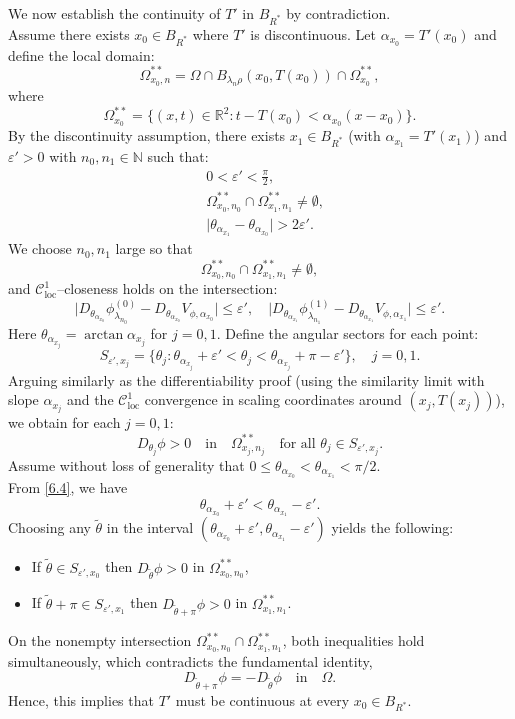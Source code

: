\documentclass[
  sn-mathphys-num,
  colorlinks,
  linkcolor=darkmagenta,
  citecolor=rufous,
  urlcolor=zaffre,
  hypertexnames=false
]{sn-jnl}
\numberwithin{equation}{section}
\begin{document}
We now establish the continuity of $T'$ in $B_{R^*}$ by contradiction.\\ Assume there exists $x_0 \in B_{R^*}$ where $T'$ is discontinuous. Let $\alpha_{x_0} = T'(x_0)$ and define the local domain:
$$
\Omega_{x_0,n}^{**} = \Omega \cap B_{\lambda_n\rho}(x_0,T(x_0)) \cap \Omega_{x_0}^{**},
$$
where 
$$
\Omega_{x_0}^{**} = \{(x,t) \in \mathbb{R}^2 : t - T(x_0) < \alpha_{x_0}(x - x_0)\}.
$$
By the discontinuity assumption, there exists $x_1 \in B_{R^*}$ (with $\alpha_{x_1} = T'(x_1)$) and $\varepsilon' > 0$ with $n_0, n_1 \in \mathbb{N}$ such that:
\begin{equation}\label{6.4}
\begin{split}
& 0<\varepsilon'<\frac{\pi}{2},\\
& \Omega_{x_0,n_0}^{**}\cap \Omega_{x_1,n_1}^{**}\neq \emptyset,\\
& \big|\theta_{\alpha_{x_1}}-\theta_{\alpha_{x_0}}\big|>2\varepsilon'.
\end{split}
\end{equation}
We choose $n_0,n_1$ large so that
$$
\Omega_{x_0,n_0}^{**}\cap \Omega_{x_1,n_1}^{**}\neq\emptyset,
$$
and $\mathcal{C}^1_{\text{loc}}$–closeness holds on the intersection:
$$
\bigl|D_{\theta_{\alpha_{x_0}}}\phi_{\lambda_{n_0}}^{(0)}-D_{\theta_{\alpha_{x_0}}}V_{\phi,\alpha_{x_0}}\bigr|\le \varepsilon',
\quad
\bigl|D_{\theta_{\alpha_{x_1}}}\phi_{\lambda_{n_1}}^{(1)}-D_{\theta_{\alpha_{x_1}}}V_{\phi,\alpha_{x_1}}\bigr|\le \varepsilon'.
$$
Here $\theta_{\alpha_{x_j}} = \arctan \alpha_{x_j}$ for $j=0,1$. Define the angular sectors for each point:
$$
S_{\varepsilon',x_j} = \{\theta_j : \theta_{\alpha_{x_j}} + \varepsilon' < \theta_j < \theta_{\alpha_{x_j}} + \pi - \varepsilon'\}, \quad j=0,1.
$$
Arguing similarly as the differentiability proof  (using the similarity limit with slope $\alpha_{x_j}$ and the $\mathcal{C}^1_{\mathrm{loc}}$ convergence in scaling coordinates around $(x_j,T(x_j))$), we obtain for each $j=0,1$:
$$
D_{\theta_j}\phi > 0 \quad \text{in} \quad \Omega_{x_j,n_j}^{**} \quad \text{for all } \theta_j \in S_{\varepsilon',x_j}.
$$
Assume without loss of generality that $0 \leq \theta_{\alpha_{x_0}} < \theta_{\alpha_{x_1}} < \pi/2$.\\ From \eqref{6.4}, we have
$$
\theta_{\alpha_{x_0}} + \varepsilon' < \theta_{\alpha_{x_1}} - \varepsilon'.
$$
Choosing any $\tilde{\theta}$ in the interval $(\theta_{\alpha_{x_0}} + \varepsilon', \theta_{\alpha_{x_1}} - \varepsilon')$ yields the following:
\begin{itemize}
\item[(i)] If  $\tilde{\theta} \in S_{\varepsilon',x_0}$ then $D_{\tilde{\theta}}\phi > 0$ in $\Omega_{x_0,n_0}^{**}$,
\item[(ii)] If   $\tilde{\theta} + \pi \in S_{\varepsilon',x_1}$ then $ D_{\tilde{\theta}+\pi}\phi > 0$ in $\Omega_{x_1,n_1}^{**}$.
\end{itemize}
On the nonempty intersection $\Omega_{x_0,n_0}^{**}\cap \Omega_{x_1,n_1}^{**}$, both inequalities hold simultaneously, which contradicts the fundamental identity,
$$
D_{\tilde{\theta}+\pi}\phi = -D_{\tilde{\theta}}\phi \quad \text{in} \quad \Omega.
$$
Hence, this implies that $T'$ must be continuous at every $x_0 \in B_{R^*}$.
\end{document}
